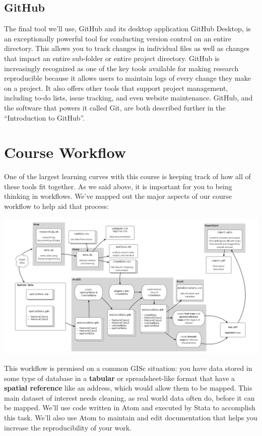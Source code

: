 \documentclass[]{book}
\theoremstyle{definition}
\theoremstyle{definition}
\theoremstyle{remark}
\begin{document}
\subsection{GitHub}\label{github}

The final tool we'll use, GitHub and its desktop application GitHub
Desktop, is an exceptionally powerful tool for conducting version
control on an entire directory. This allows you to track changes in
individual files as well as changes that impact an entire sub-folder or
entire project directory. GitHub is increasingly recognized as one of
the key tools available for making research reproducible because it
allows users to maintain logs of every change they make on a project. It
also offers other tools that support project management, including to-do
lists, issue tracking, and even website maintenance. GitHub, and the
software that powers it called Git, are both described further in the
``Introduction to GitHub''.

\section{Course Workflow}\label{course-workflow}

One of the largest learning curves with this course is keeping track of
how all of these tools fit together. As we said above, it is important
for you to being thinking in workflows. We've mapped out the major
aspects of our course workflow to help aid that process:

\includegraphics[width=1\linewidth]{images/gisFlow1}

This workflow is premised on a common GISc situation: you have data
stored in some type of database in a \textbf{tabular} or
spreadsheet-like format that have a \textbf{spatial reference} like an
address, which would allow them to be mapped. This main dataset of
interest needs cleaning, as real world data often do, before it can be
mapped. We'll use code written in Atom and executed by Stata to
accomplish this task. We'll also use Atom to maintain and edit
documentation that helps you increase the reproducibility of your work.
\end{document}
